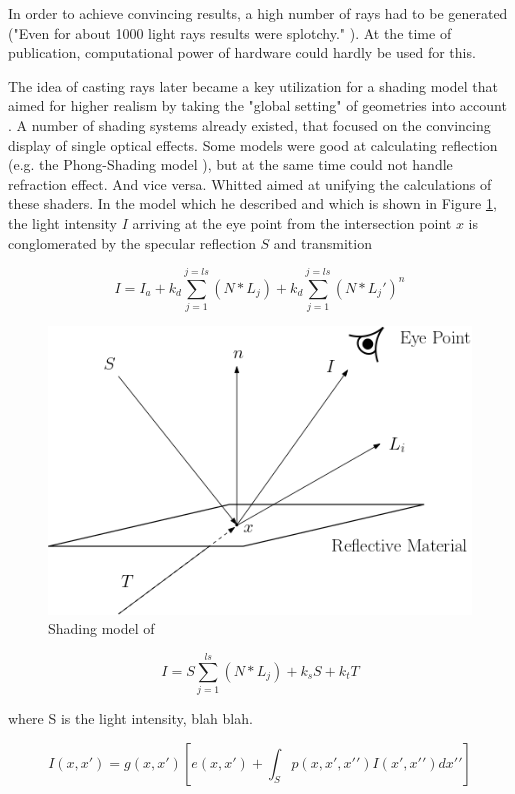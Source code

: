 In order to achieve convincing results, a high number of rays had to be generated ("Even for about 1000 light rays results were splotchy." \cite[p 3]{appel1968some}). At the time of publication, computational power of hardware could hardly be used for this.

The idea of casting rays later became a key utilization for a shading model that aimed for higher realism by taking the "global setting" of geometries into account \cite{whitted1979improved}. A number of shading systems already existed, that focused on the convincing display of single optical effects. Some models were good at calculating reflection (e.g. the Phong-Shading model \cite{phong1975illumination}), but at the same time could not handle refraction effect. And vice versa. Whitted aimed at unifying the calculations of these shaders. 
In the model which he described and which is shown in Figure \ref{fig:whitted_model}, the light intensity $I$ arriving at the eye point from the intersection point $x$ is conglomerated by the specular reflection $S$ and transmition 

\begin{equation}
I = I_{a} + k_{d} \sum_{j=1}^{j=ls}(N*L_{j}) + k_{d} \sum_{j=1}^{j=ls}(N*L_{j}\prime)^n
\end{equation}

\begin{figure}[h]
	\centering
	\includegraphics[width=.7\linewidth]{img/1 fundamentals/whitted.png}
	\caption{Shading model of \cite{whitted1979improved}}
	\label{fig:whitted_model}
\end{figure}


\begin{equation}
I = S \sum_{j=1}^{ls} (N*L_{j}) + k_{s}S + k_{t}T
\end{equation}

where S is the light intensity, blah blah.


\begin{equation}
I(x,x\prime) = g(x,x\prime) \left[ e(x,x\prime) + \int_S p(x,x\prime,x\prime\prime)I(x\prime,x\prime\prime) dx\prime\prime \right] 
\end{equation}



